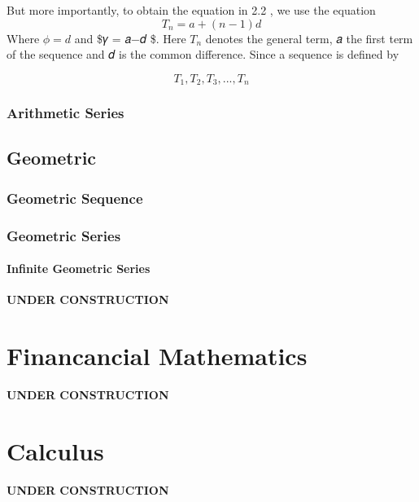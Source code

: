 \documentclass[
  letterpaper,
  DIV=11,
  numbers=noendperiod]{scrreprt}
\begin{document}
But more importantly, to obtain the equation in 2.2 , we use the
equation \[
T_n= 𝑎+(𝑛−1)𝑑                               
\] Where \(𝜙 = d\) and \$𝛾 = 𝑎−𝑑 \$. Here \(𝑇_𝑛\) denotes the general
term, 𝑎 the first term of the sequence and 𝑑 is the common difference.
Since a sequence is defined by

\[
T_1,T_2,T_3,...,T_n
\]

\subsection{Arithmetic Series}\label{arithmetic-series}

\section*{Geometric}\label{geometric}


\subsection{Geometric Sequence}\label{geometric-sequence}

\subsection{Geometric Series}\label{geometric-series}

\subsubsection{Infinite Geometric
Series}\label{infinite-geometric-series}

\textbf{UNDER CONSTRUCTION}


\chapter{Financancial Mathematics}\label{financancial-mathematics}

\textbf{UNDER CONSTRUCTION}


\chapter{Calculus}\label{calculus}

\textbf{UNDER CONSTRUCTION}
\end{document}
